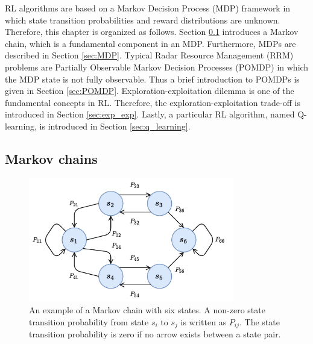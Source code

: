 \documentclass[english, 12pt, a4paper, elec, utf8, a-1b, online]{aaltothesis}
\begin{document}
RL algorithms are based on a Markov Decision Process (MDP) framework in which state transition probabilities and reward distributions are unknown.
Therefore, this chapter is organized as follows.
Section \ref{sec:MC} introduces a Markov chain, which is a fundamental component in an MDP.
Furthermore, MDPs are described in Section \ref{sec:MDP}.
Typical Radar Resource Management (RRM) problems are Partially Observable Markov Decision Processes (POMDP) in which the MDP state is not fully observable. 
Thus a brief introduction to POMDPs is given in Section \ref{sec:POMDP}.
Exploration-exploitation dilemma is one of the fundamental concepts in RL. Therefore, the exploration-exploitation trade-off is introduced in Section \ref{sec:exp_exp}. 
Lastly, a particular RL algorithm, named Q-learning, is introduced in Section \ref{sec:q_learning}.


\subsection{Markov chains} \label{sec:MC}

\begin{figure}[b]
    \centering
    \includegraphics[width=0.8\textwidth]{figures/MarkovChain.pdf}
    \caption{
    An example of a Markov chain with six states. 
    A non-zero state transition probability from state $s_i$ to $s_j$ is written as $P_{ij}$.
    The state transition probability is zero if no arrow exists between a state pair. }
    \label{fig:mc}
\end{figure}
\end{document}
